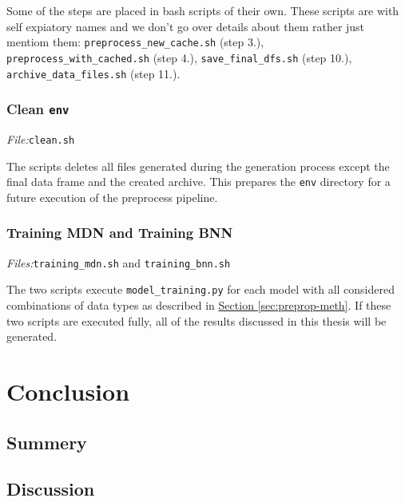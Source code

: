 \documentclass[12pt,a4paper,twoside]{scrartcl}
\numberwithin{equation}{section}
\newcommand{\refsec}[1]{\hyperref[#1]{Section \ref*{#1}}}
\begin{document}
Some of the steps are placed in bash scripts of their own. These scripts are with self expiatory names and we don't go over details about them rather just mentiom them: \texttt{preprocess\_new\_cache.sh} (step 3.), \texttt{preprocess\_with\_cached.sh} (step 4.), \texttt{save\_final\_dfs.sh} (step 10.), \texttt{archive\_data\_files.sh} (step 11.).
\subsubsection{Clean \texttt{env}}\label{sec:script-clean}
\noindent\emph{File:}\texttt{clean.sh}

The scripts deletes all files generated during the generation process except the final data frame and the created archive. This prepares the \texttt{env} directory for a future execution of the preprocess pipeline.

\subsubsection{Training MDN and Training BNN}\label{sec:script-train}
\noindent\emph{Files:}\texttt{training\_mdn.sh} and \texttt{training\_bnn.sh}

The two scripts execute \texttt{model\_training.py} for each model with all considered combinations of data types as described in \refsec{sec:preprop-meth}. If these two scripts are executed fully, all of the results discussed in this thesis will be generated. 

\section{Conclusion}\label{sec:conclusion}
\subsection{Summery}
\subsection{Discussion}
\clearpage
{}


\end{document}
